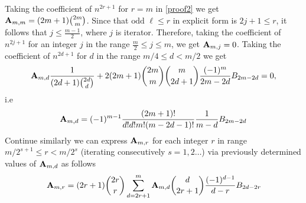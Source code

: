 \documentclass[12pt,letterpaper,oneside,reqno]{amsart}
\newcommand \bernoulli [2][B] {{#1}\sb{#2}}
\newcommand \coeffA [3][A] {{\mathbf{#1}} \sb{#2,#3}}
\numberwithin{equation}{section}
\begin{document}
    Taking the coefficient of $n^{2r+1}$ for $r=m$ in \eqref{proof2} we get $\coeffA{m}{m} = (2m+1) \binom{2m}{m}$.
    Since that $\text{odd } \ell \leq r$ in explicit form is $2j + 1 \leq r$, it follows that $j \leq \frac{m-1}{2}$,
    where $j$ is iterator.
    Therefore, taking the coefficient of $n^{2j+1}$ for an integer $j$ in the range $\frac{m}{2} \leq j \leq m$,
    we get $\coeffA{m}{j} = 0$.
    Taking the coefficient of $n^{2d+1}$ for $d$ in the range $m/4 \leq d < m/2$ we get
    \begin{equation*}
        \coeffA{m}{d} \frac{1}{(2d+1) \binom{2d}{d}}
        +2 (2m+1) \binom{2m}{m} \binom{m}{2d+1} \frac{(-1)^m}{2m-2d} \bernoulli{2m-2d} = 0,
    \end{equation*}
    i.e
    \begin{equation*}
        \coeffA{m}{d} = (-1)^{m-1} \frac{(2m+1)!}{d!d!m!(m-2d-1)!} \frac{1}{m-d} \bernoulli{2m-2d}
    \end{equation*}
    Continue similarly we can express $\coeffA{m}{r}$ for each integer $r$ in range $m/2^{s+1}\leq r < m/2^s$
    (iterating consecutively $s=1,2\dots$) via previously determined values of $\coeffA{m}{d}$ as follows
    \begin{equation*}
        \coeffA{m}{r} =
        (2r+1) \binom{2r}{r} \sum_{d=2r+1}^{m} \coeffA{m}{d} \binom{d}{2r+1} \frac{(-1)^{d-1}}{d-r}
        \bernoulli{2d-2r}
    \end{equation*}
\end{document}

